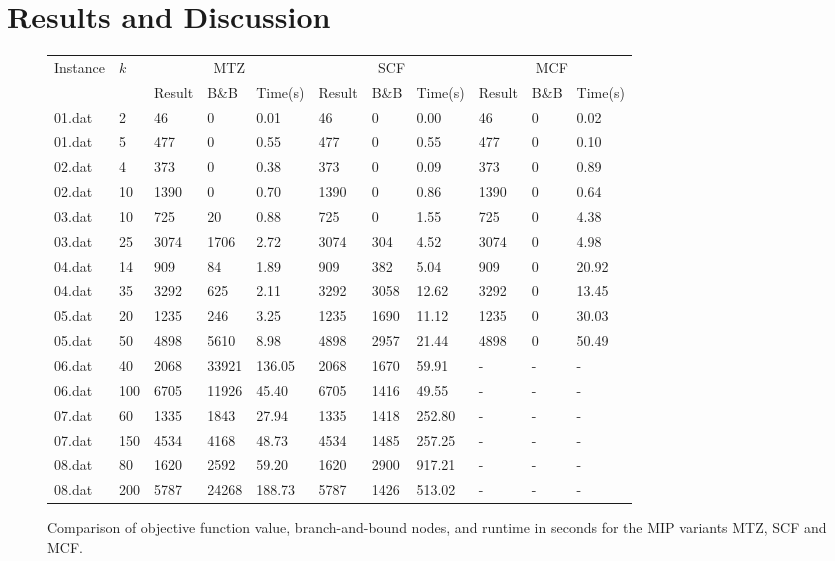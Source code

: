 \documentclass{article}
\begin{document}
\section{Results and Discussion}


\begin{figure}[H]
\centering
\begin{tabular}{lllllllllll}
\toprule
Instance & $k$ & \multicolumn{3}{c}{MTZ} & \multicolumn{3}{c}{SCF} & \multicolumn{3}{c}{MCF} \\
& & Result & B\&B & Time(s) &
    Result & B\&B & Time(s) &
    Result & B\&B & Time(s) \\
\midrule
01.dat & 2   & 46   & 0     & 0.01   & 46   & 0    & 0.00   & 46   & 0 & 0.02 \\
01.dat & 5   & 477  & 0     & 0.55   & 477  & 0    & 0.55   & 477  & 0 & 0.10 \\
02.dat & 4   & 373  & 0     & 0.38   & 373  & 0    & 0.09   & 373  & 0 & 0.89 \\
02.dat & 10  & 1390 & 0     & 0.70   & 1390 & 0    & 0.86   & 1390 & 0 & 0.64 \\
03.dat & 10  & 725  & 20    & 0.88   & 725  & 0    & 1.55   & 725  & 0 & 4.38 \\
03.dat & 25  & 3074 & 1706  & 2.72   & 3074 & 304  & 4.52   & 3074 & 0 & 4.98 \\
04.dat & 14  & 909  & 84    & 1.89   & 909  & 382  & 5.04   & 909  & 0 & 20.92 \\
04.dat & 35  & 3292 & 625   & 2.11   & 3292 & 3058 & 12.62  & 3292 & 0 & 13.45 \\
05.dat & 20  & 1235 & 246   & 3.25   & 1235 & 1690 & 11.12  & 1235 & 0 & 30.03 \\
05.dat & 50  & 4898 & 5610  & 8.98   & 4898 & 2957 & 21.44  & 4898 & 0 & 50.49 \\
06.dat & 40  & 2068 & 33921 & 136.05 & 2068 & 1670 & 59.91  & -    & - & - \\
06.dat & 100 & 6705 & 11926 & 45.40  & 6705 & 1416 & 49.55  & -    & - & - \\
07.dat & 60  & 1335 & 1843  & 27.94  & 1335 & 1418 & 252.80 & -    & - & - \\
07.dat & 150 & 4534 & 4168  & 48.73  & 4534 & 1485 & 257.25 & -    & - & - \\
08.dat & 80  & 1620 & 2592  & 59.20  & 1620 & 2900 & 917.21 & -    & - & - \\
08.dat & 200 & 5787 & 24268 & 188.73 & 5787 & 1426 & 513.02 & -    & - & - \\
\bottomrule
\end{tabular}
\caption{Comparison of objective function value, branch-and-bound nodes, and runtime in seconds for the MIP variants MTZ, SCF and MCF.} 
\label{fig:go}
\end{figure}
\end{document}
